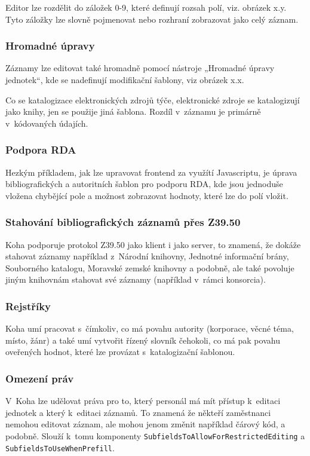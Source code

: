 \documentclass[
	11pt, oneside, printed, draft, 
	table,   %
	lof,     %
	lot     %
]{fithesis3}
\newcommand{\code}[1]{\texttt{#1}}
\begin{document}
{Editor lze rozdělit do záložek 0-9, které definují rozsah polí, viz. obrázek x.y. Tyto záložky lze slovně pojmenovat nebo rozhraní zobrazovat jako celý záznam. %


\subsubsection{Hromadné úpravy}
Záznamy lze editovat také hromadně pomocí nástroje „Hromadné úpravy jednotek“, kde se nadefinují modifikační šablony, viz obrázek x.x.%


Co se katalogizace elektronických zdrojů týče, elektronické zdroje se katalogizují jako knihy, jen se použije jiná šablona. Rozdíl v~záznamu je primárně v~kódovaných údajích.

\subsubsection{Podpora RDA}
Hezkým příkladem, jak lze upravovat frontend za využítí Javascriptu, je úprava bibliografických a autoritních šablon pro podporu RDA, kde jsou jednoduše vložena chybějící pole a možnost zobrazovat hodnoty, které lze do polí vložit.

\subsubsection{Stahování bibliografických záznamů přes Z39.50}
Koha podporuje protokol Z39.50 jako klient i jako server, to znamená, že dokáže stahovat záznamy například z~Národní knihovny, Jednotné informační brány, Souborného katalogu, Moravské zemské knihovny a podobně, ale také povoluje jiným knihovnám stahovat své záznamy (například v~rámci konsorcia).

\subsubsection{Rejstříky}
Koha umí pracovat s~čímkoliv, co má povahu autority (korporace, věcné téma, místo, žánr) a také umí vytvořit řízený slovník čehokoli, co má pak povahu oveřených hodnot, které lze provázat s~katalogizační šablonou.

\subsubsection{Omezení práv}
V~Koha lze udělovat práva pro to, který personál má mít přístup k~editaci jednotek a který k~editaci záznamů. To znamená že někteří zaměstnanci nemohou editovat záznam, ale mohou jenom změnit například čárový kód, a podobně. Slouží k~tomu komponenty \code{SubfieldsToAllowForRestrictedEditing} a \code{SubfieldsToUseWhenPrefill}.

}
\end{document}
